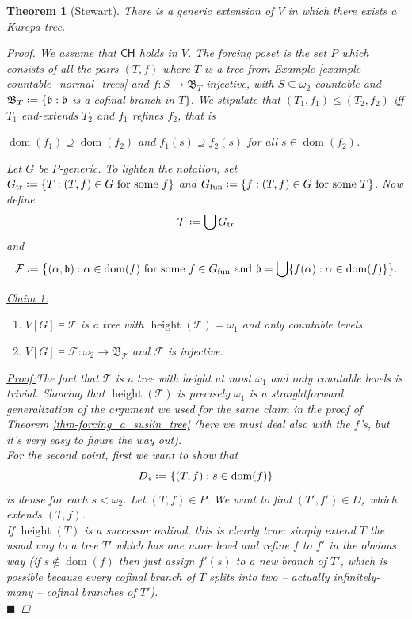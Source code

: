 \documentclass[11pt,a4paper]{report}
\newtheorem{theorem}{Theorem}[chapter] %
\theoremstyle{definition}
\theoremstyle{num.custom-title}
\theoremstyle{custom-title}
\newenvironment{claim}[1]{\par\noindent\underline{Claim#1:}\space}{} %
\newenvironment{claimproof}[1]{\par\noindent\underline{Proof:}\space#1}{\leavevmode\unskip\penalty9999 \hbox{}\nobreak\hfill\quad\hbox{$\blacksquare$}} %
\DeclareMathOperator{\dom}{dom}
\DeclareMathOperator{\sse}{\subseteq}
\DeclareMathOperator{\height}{height}
\newcommand{\CH}{\ensuremath{\mathsf{CH}}\xspace}
\newcommand{\F}{\mathcal{F}}
\newcommand{\T}{\mathcal{T}}
\newcommand*{\defeq}{\mathrel{\rlap{%
                     \raisebox{0.3ex}{$\cdot$}}%
                     \raisebox{-0.3ex}{$\cdot$}}%
                     =}
\begin{document}
\begin{theorem}[Stewart]\label{thm-forcing_a_kurepa_tree}
There is a generic extension of $V$ in which there exists a Kurepa tree. 
\begin{proof}
We assume that \CH holds in $V$. The forcing poset is the set $P$ which consists of all the pairs $(T,f)$ where $T$ is a tree from Example \ref{example-countable_normal_trees} and $f \colon S \to \mathfrak{B}_T$ injective, with $S \sse \omega_2$ countable and $\mathfrak{B}_T \defeq \{\mathfrak{b} : \mathfrak{b}$ is a cofinal branch in $T \}$. We stipulate that $(T_1,f_1) \leq (T_2,f_2)$ iff $T_1$ end-extends $T_2$ and $f_1$ \emph{refines} $f_2$, that is
\begin{center}
$\dom(f_1) \supseteq \dom(f_2)$ \quad and \quad $f_1(s) \supseteq f_2(s)$ for all $s \in \dom(f_2)$.
\end{center}
Let $G$ be $P$-generic. To lighten the notation, set $G_{\text{tr}} \defeq \{T : (T,f) \in G \text{ for some } f\}$ and $G_{\text{fun}} \defeq \{f : (T,f) \in G \text{ for some } T\}$. Now define
\[
\T \defeq \bigcup G_{\text{tr}}
\]
and
\[
\F \defeq \big\{ (\alpha, \mathfrak{b}) : \alpha \in \dom(f) \text{ for some } f \in G_{\text{fun}} \text{ and } \mathfrak{b} = \bigcup \{f(\alpha) : \alpha \in \dom(f)\} \big\}.
\]
\begin{claim}{ 1}
\begin{enumerate}
\item $V[G] \models \T$ is a tree with $\height(\T)=\omega_1$ and only countable levels.
\item $V[G] \models \F \colon \omega_2 \to \mathfrak{B}_{\T}$ and $\F$ is injective.
\end{enumerate}
\begin{claimproof}
The fact that $\T$ is a tree with height at most $\omega_1$ and only countable levels is trivial. Showing that $\height(\T)$ is precisely $\omega_1$ is a straightforward generalization of the argument we used for the same claim in the proof of Theorem \ref{thm-forcing_a_suslin_tree} (here we must deal also with the $f$'s, but it's very easy to figure the way out).\\
For the second point, first we want to show that
\[
D_s \defeq \{(T,f) : s \in \dom(f)\}
\]
is dense for each $s < \omega_2$. Let $(T,f) \in P$. We want to find $(T',f') \in D_s$ which extends $(T,f)$.\\
If $\height(T)$ is a successor ordinal, this is clearly true: simply extend $T$ the usual way to a tree $T'$ which has one more level and refine $f$ to $f'$ in the obvious way (if $s \not\in \dom(f)$ then just assign $f'(s)$ to a new branch of $T'$, which is possible because every cofinal branch of $T$ splits into two -- actually infinitely-many -- cofinal branches of $T'$).\\

\end{claimproof}
\end{claim}
\end{proof}
\end{theorem}
\end{document}
